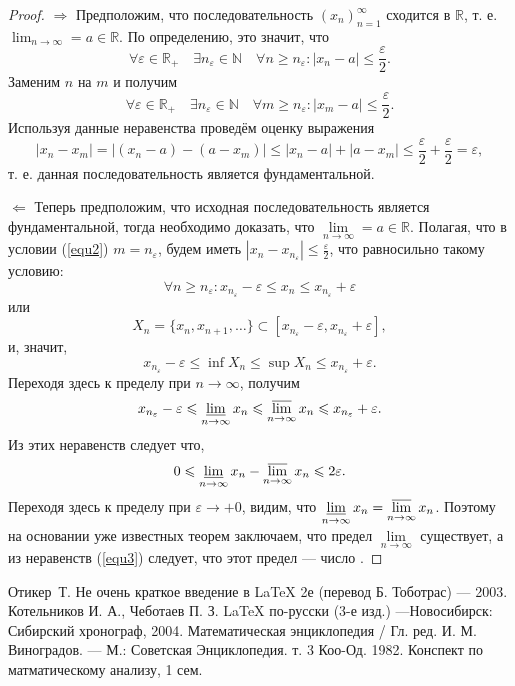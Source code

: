 \documentclass[a4paper,12pt]{article}
\begin{document}
\begin{proof}$\Rightarrow$ Предположим, что последовательность $(x_n)^\infty_{n=1}$ сходится в $\mathbb{R}$, т. е. $\lim_{n\rightarrow \infty}=a\in\mathbb{R}$. По определению, это значит, что \begin{equation}\label{equ2}\forall\varepsilon\in\mathbb{R}_+ \quad \exists n_\varepsilon\in\mathbb{N}\quad\forall n\geqslant n_\varepsilon: |x_n-a|\leqslant\frac{\varepsilon}{2}.\end{equation} Заменим $n$ на $m$ и получим \[\forall\varepsilon\in\mathbb{R}_+ \quad \exists n_\varepsilon\in\mathbb{N}\quad\forall m\geqslant n_\varepsilon: |x_m-a|\leqslant\frac{\varepsilon}{2}.\] Используя данные неравенства проведём оценку выражения \[|x_n-x_m|=|(x_n-a)-(a-x_m)|\leqslant|x_n-a|+|a-x_m|\leqslant\frac{\varepsilon}{2}+\frac{\varepsilon}{2}=\varepsilon,\]т. е. данная последовательность является фундаментальной.

$\Leftarrow$ Теперь предположим, что исходная последовательность является фундаментальной, тогда необходимо доказать, что $\lim\limits_{n\rightarrow \infty}=a\in\mathbb{R}$. Полагая, что в условии (\ref{equ2}) $m=n_\varepsilon$, будем иметь $|x_n-x_{n_\varepsilon}|\leqslant\frac{\varepsilon}{2}$, что равносильно такому условию: \[\forall n\geqslant n_\varepsilon: x_{n_\varepsilon}-\varepsilon\leqslant x_n\leqslant x_{n_\varepsilon}+\varepsilon\] или \[X_n=\{x_n, x_{n+1},\ldots\}\subset [x_{n_\varepsilon}-\varepsilon,x_{n_\varepsilon}+\varepsilon],\] и, значит, \[x_{n_\varepsilon}-\varepsilon\leqslant \inf{X_n}\leqslant \sup{X_n}\leqslant x_{n_\varepsilon}+\varepsilon.\] Переходя здесь к пределу при $n\rightarrow\infty$, получим \begin{equation}\label{equ3}x_{n_\varepsilon}-\varepsilon\leqslant \varliminf_{n\rightarrow \infty}x_n\leqslant \varlimsup_{n\rightarrow \infty}x_n\leqslant x_{n_\varepsilon}+\varepsilon.\end{equation} Из этих неравенств следует что, \[0\leqslant \varliminf_{n\rightarrow \infty}x_n-\varlimsup_{n\rightarrow \infty}x_n\leqslant 2\varepsilon.\] Переходя здесь к пределу при $\varepsilon \rightarrow +0$, видим, что $\varliminf\limits_{n\rightarrow \infty}x_n=\varlimsup\limits_{n\rightarrow \infty}x_n$. Поэтому на основании уже известных теорем заключаем, что предел $\lim\limits_{n\rightarrow \infty}$ существует, а из неравенств (\ref{equ3}) следует, что этот предел --- число \cite{Lecture}.
\end{proof}
\begin{thebibliography}{7}
 Отикер~Т. Не очень краткое введение в LaTeX 2е (перевод Б. Тоботрас) --- 2003.
 Котельников И. А., Чеботаев П. З. LaTeX по-русски (3-е изд.) ---Новосибирск: Сибирский хронограф, 2004.
 Математическая энциклопедия / Гл. ред. И. М. Виноградов. --- М.: Советская Энциклопедия. т. 3 Коо-Од. 1982.
 Конспект по матматическому анализу, 1 сем.
\end{thebibliography}
\end{document}
